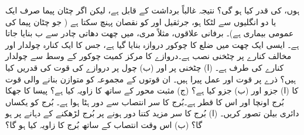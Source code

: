   ہوں،  کی قدر کیا ہو گی؟ نتیجہ غالباً برداشت کے قابل ہے، لیکن اگر چٹان پیما صرف ایک یا دو انگلیوں سے لٹکا ہو، جرثقیل  اور     کو نقصان پہنچ سکتا ہے ( جو چٹان پیما کی عمومی بیماری    ہے)۔
برفانی علاقوں، مثلاً مری، میں چھت دھاتی چادر  سے ب بنایا جاتا ہے۔ ایسی ایک چھت میں  ضلع کا چوکور دروازہ بنایا گیا ہے، جس کا ایک کنارہ چولدار  اور مخالف کنارے پر  چٹخنی نصب ہے۔دروازے کا مرکز کمیت چوکور کے وسط سے   چولدار کنارے  کی طرف ہے۔ (ا) چٹخنی پر اور (ب) چول پر دروازے کی قوت کی قدریں  کیا ہیں؟
 ذرے  پر  قوت  اور  عمل پیرا ہیں۔ ان قوتوں کے مجموعہ  کو متوازن بنانے والی قوت   کا (ا)  جزو اور (ب)  جزو کیا ہے؟ (ج) مثبت  محور کے ساتھ  کا  زاویہ کیا ہے؟
پیسا کا جھکا بُرج   اونچا اور اس کا قطر  ہے۔بُرج کا سر انتصاب سے  دور  ہٹا ہوا ہے۔ بُرج کو یکساں دائری بیلن تصور کریں۔ (ا)  بُرج کا سر مزید کتنا دور  ہونے پر بُرج  لڑھکنے کے دہانے پر  ہو گا؟ (ب)  اس وقت انتصاب کے ساتھ بُرج کا زاویہ کیا ہو گا؟
